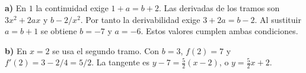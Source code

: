 \textbf{a)} En $1$ la continuidad exige $1+a=b+2$.
Las derivadas de los tramos son $3x^2+2ax$ y $b-2/x^2$.
Por tanto la derivabilidad exige $3+2a=b-2$.
Al sustituir $a=b+1$ se obtiene $b=-7$ y $a=-6$.
Estos valores cumplen ambas condiciones.

\textbf{b)} En $x=2$ se usa el segundo tramo. Con $b=3$,
$f(2)=7$ y $f'(2)=3-2/4=5/2$.
La tangente es $y-7=\frac52(x-2)$, o $\boxed{y=\frac52 x+2}$.
